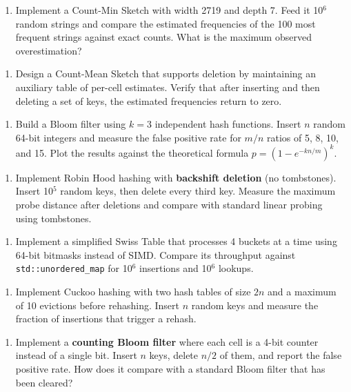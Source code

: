 \begin{enumerate}
\item Implement a Count-Min Sketch with width 2719 and depth 7. Feed it 10$^{6}$ random strings and compare the estimated frequencies of the 100 most frequent strings against exact counts. What is the maximum observed overestimation?
\end{enumerate}

\begin{enumerate}
\item Design a Count-Mean Sketch that supports deletion by maintaining an auxiliary table of per-cell estimates. Verify that after inserting and then deleting a set of keys, the estimated frequencies return to zero.
\end{enumerate}

\begin{enumerate}
\item Build a Bloom filter using $k = 3$ independent hash functions. Insert $n$ random 64-bit integers and measure the false positive rate for $m/n$ ratios of 5, 8, 10, and 15. Plot the results against the theoretical formula $p = (1 - e^{-kn/m})^{k}$.
\end{enumerate}

\begin{enumerate}
\item Implement Robin Hood hashing with \textbf{backshift deletion} (no tombstones). Insert 10$^{5}$ random keys, then delete every third key. Measure the maximum probe distance after deletions and compare with standard linear probing using tombstones.
\end{enumerate}

\begin{enumerate}
\item Implement a simplified Swiss Table that processes 4 buckets at a time using 64-bit bitmasks instead of SIMD. Compare its throughput against \texttt{std::unordered\_map} for 10$^{6}$ insertions and 10$^{6}$ lookups.
\end{enumerate}

\begin{enumerate}
\item Implement Cuckoo hashing with two hash tables of size $2n$ and a maximum of 10 evictions before rehashing. Insert $n$ random keys and measure the fraction of insertions that trigger a rehash.
\end{enumerate}

\begin{enumerate}
\item Implement a \textbf{counting Bloom filter} where each cell is a 4-bit counter instead of a single bit. Insert $n$ keys, delete $n/2$ of them, and report the false positive rate. How does it compare with a standard Bloom filter that has been cleared?
\end{enumerate}

